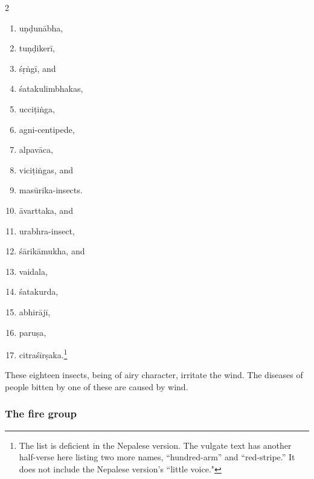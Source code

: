 \begin{translation}
\item[5--6]
\begin{multicols}{2}
\begin{enumerate}
    \item \Gls{uṇḍunābha},
    \item \Gls{tuṇḍikerī},
    \item \Gls{śṛṅgī}, and
    \item \Glspl{śatakulimbhaka},
    \item \Gls{ucciṭiṅga},
    \item \Gls{agni-centipede},
    \item \Gls{alpavāca},
    \item \Glspl{viciṭiṅga},
    and
    \item \Glspl{masūrika-insect}.
    \item \Gls{āvarttaka}, and
    \item \Gls{urabhra-insect},
    \item \Gls{śārikāmukha}, and
    \item \Gls{vaidala},
    \item \Gls{śatakurda},
    \item \Gls{abhirājī},
    \item \Gls{paruṣa},
    \item \Gls{citraśīrṣaka}.\footnote{The list is deficient in the Nepalese version.  
    The
        vulgate text has another half-verse here listing two more names,
         “hundred-arm” and  “red-stripe.” It does
        not include the Nepalese version's  “little voice."}
\end{enumerate}
\end{multicols}

\item[7cd--8ab]

These eighteen insects, being of airy character, irritate the
wind.
The diseases of people bitten by one of these are caused by wind.

\subsubsection{The fire group}


\end{translation}
